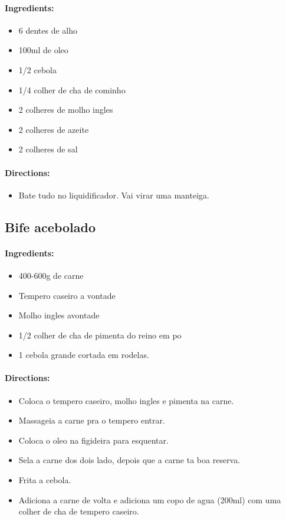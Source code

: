 \documentclass{article}
\begin{document}
\paragraph{Ingredients:}
\begin{itemize}
    \item 6 dentes de alho
    \item 100ml de oleo
    \item 1/2 cebola
    \item 1/4 colher de cha de cominho
    \item 2 colheres de molho ingles
    \item 2 colheres de azeite
    \item 2 colheres de sal
\end{itemize}

\paragraph{Directions:}
\begin{itemize}
    \item Bate tudo no liquidificador. Vai virar uma manteiga.
\end{itemize}

\subsection{Bife acebolado}

\paragraph{Ingredients:}
\begin{itemize}
    \item 400-600g de carne
    \item Tempero caseiro a vontade
    \item Molho ingles  avontade
    \item 1/2 colher de cha de pimenta do reino em po
    \item 1 cebola grande cortada em rodelas.
\end{itemize}

\paragraph{Directions:}
\begin{itemize}
    \item Coloca o tempero caseiro, molho ingles e pimenta na carne.
    \item Massageia a carne pra o tempero entrar.
    \item Coloca o oleo na figideira para esquentar.
    \item Sela a carne dos dois lado, depois que a carne ta boa reserva.
    \item Frita a cebola.
    \item Adiciona a carne de volta e adiciona um copo de agua (200ml) com uma colher de cha de tempero caseiro.
\end{itemize}
\end{document}
